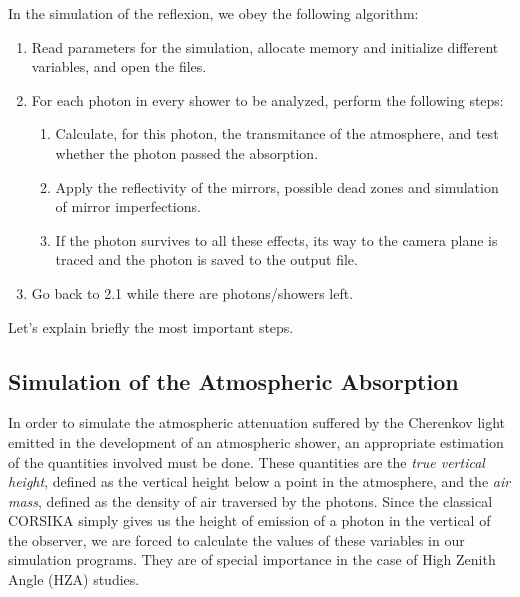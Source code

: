 \simprocessfig
%
In the simulation of the reflexion, we obey the following algorithm:
%
\begin{enumerate}[1.]
\item Read parameters for the simulation, allocate memory and
  initialize different variables, and open the files.

\item For each \Cherenkov photon in every shower to be analyzed,
  perform the following steps:
  
  \begin{enumerate}[\theenumi.1.]
  \item Calculate, for this photon, the transmitance of the
    atmosphere, and test whether the photon passed the absorption.
    
  \item Apply the reflectivity of the mirrors, possible dead zones and
    simulation of mirror imperfections.

  \item If the photon survives to all these effects, its way to the
    camera plane is traced and the photon is saved to the output file.
  \end{enumerate}

\item Go back to 2.1 while there are photons/showers left.
\end{enumerate}

Let's explain briefly the most important steps.

\subsection{Simulation of the Atmospheric Absorption}

In order to simulate the atmospheric attenuation suffered by the
Cherenkov light emitted in the development of an atmospheric shower,
an appropriate estimation of the quantities involved must be done.
These quantities are the \emph{true vertical height}, defined as the
vertical height below a point in the atmosphere, and the \emph{air
  mass}, defined as the density of air traversed by the photons. Since
the classical CORSIKA simply gives us the height of emission of a
photon in the vertical of the observer, we are forced to calculate the
values of these variables in our simulation programs. They are of
special importance in the case of High Zenith Angle (HZA) studies.


